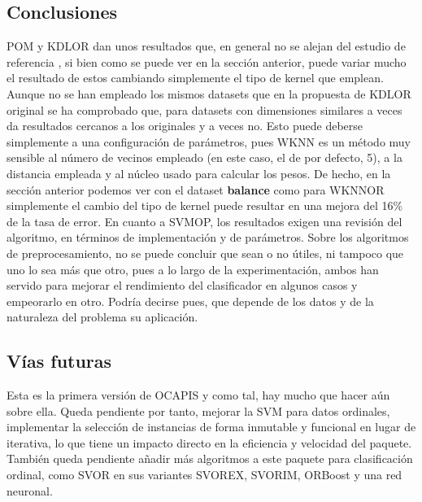 \subsection{Conclusiones}
POM y KDLOR dan unos resultados que, en general no se alejan del estudio de referencia \cite{Gutiérrez2016}, si bien como se puede ver en la sección anterior, puede variar mucho el resultado de estos cambiando simplemente el tipo de kernel que emplean. Aunque no se han empleado los mismos datasets que en la propuesta de KDLOR original \cite{duivesteijn2008nearest} se ha comprobado que, para datasets con dimensiones similares a veces da resultados cercanos a los originales y a veces no. Esto puede deberse simplemente a una configuración de parámetros, pues WKNN es un método muy sensible al número de vecinos empleado (en este caso, el de por defecto, 5), a la distancia empleada y al núcleo usado para calcular los pesos. De hecho, en la sección anterior podemos ver con el dataset \textbf{balance} como para WKNNOR simplemente el cambio del tipo de kernel puede resultar en una mejora del 16\% de la tasa de error. \newline
En cuanto a SVMOP, los resultados exigen una revisión del algoritmo, en términos de implementación y de parámetros. Sobre los algoritmos de preprocesamiento, no se puede concluir que sean o no útiles, ni tampoco que uno lo sea más que otro, pues a lo largo de la experimentación, ambos han servido para mejorar el rendimiento del clasificador en algunos casos y empeorarlo en otro. Podría decirse pues, que depende de los datos y de la naturaleza del problema su aplicación.

\subsection{Vías futuras}
Esta es la primera versión de OCAPIS y como tal, hay mucho que hacer aún sobre ella. Queda pendiente por tanto, mejorar la SVM para datos ordinales, implementar la selección de instancias de forma inmutable y funcional en lugar de iterativa, lo que tiene un impacto directo en la eficiencia y velocidad del paquete. También queda pendiente añadir más algoritmos a este paquete para clasificación ordinal, como SVOR en sus variantes SVOREX, SVORIM, ORBoost y una red neuronal. 
